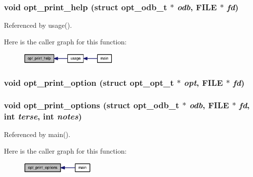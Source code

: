 \subsubsection[{opt\_\-print\_\-help}]{\setlength{\rightskip}{0pt plus 5cm}void opt\_\-print\_\-help (struct {\bf opt\_\-odb\_\-t} $\ast$ {\em odb}, \/  FILE $\ast$ {\em fd})}\label{options_8h_e73e967de719b2d753404d9db58cc143}




Referenced by usage().

Here is the caller graph for this function:\nopagebreak
\begin{figure}[H]
\begin{center}
\leavevmode
\includegraphics[width=137pt]{options_8h_e73e967de719b2d753404d9db58cc143_icgraph}
\end{center}
\end{figure}
\subsubsection[{opt\_\-print\_\-option}]{\setlength{\rightskip}{0pt plus 5cm}void opt\_\-print\_\-option (struct {\bf opt\_\-opt\_\-t} $\ast$ {\em opt}, \/  FILE $\ast$ {\em fd})}\label{options_8h_49f9e748dd4b97535490958b7510de20}


\subsubsection[{opt\_\-print\_\-options}]{\setlength{\rightskip}{0pt plus 5cm}void opt\_\-print\_\-options (struct {\bf opt\_\-odb\_\-t} $\ast$ {\em odb}, \/  FILE $\ast$ {\em fd}, \/  int {\em terse}, \/  int {\em notes})}\label{options_8h_86b86016ad1396461ed934c0ab462a35}




Referenced by main().

Here is the caller graph for this function:\nopagebreak
\begin{figure}[H]
\begin{center}
\leavevmode
\includegraphics[width=104pt]{options_8h_86b86016ad1396461ed934c0ab462a35_icgraph}
\end{center}
\end{figure}

